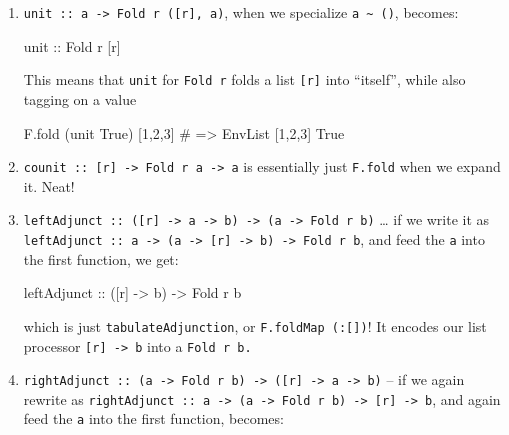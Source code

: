 \documentclass[]{article}
\newenvironment{Shaded}{}{}
\newcommand{\DataTypeTok}[1]{\textcolor[rgb]{0.56,0.13,0.00}{#1}}
\newcommand{\DecValTok}[1]{\textcolor[rgb]{0.25,0.63,0.44}{#1}}
\newcommand{\NormalTok}[1]{#1}
\newcommand{\OtherTok}[1]{\textcolor[rgb]{0.00,0.44,0.13}{#1}}
\newcommand{\PreprocessorTok}[1]{\textcolor[rgb]{0.74,0.48,0.00}{#1}}
\begin{document}
\begin{enumerate}
\def\labelenumi{\arabic{enumi}.}
\item
  \texttt{unit\ ::\ a\ -\textgreater{}\ Fold\ r\ ({[}r{]},\ a)}, when we
  specialize \texttt{a\ \textasciitilde{}\ ()}, becomes:

\begin{Shaded}
\begin{Highlighting}[]
\OtherTok{unit ::} \DataTypeTok{Fold}\NormalTok{ r [r]}
\end{Highlighting}
\end{Shaded}

  This means that \texttt{unit} for \texttt{Fold\ r} folds a list
  \texttt{{[}r{]}} into ``itself'', while also tagging on a value

\begin{Shaded}
\begin{Highlighting}[]
\NormalTok{F.fold (unit }\DataTypeTok{True}\NormalTok{) [}\DecValTok{1}\NormalTok{,}\DecValTok{2}\NormalTok{,}\DecValTok{3}\NormalTok{]}
\PreprocessorTok{\#   => EnvList [1,2,3] True}
\end{Highlighting}
\end{Shaded}
\item
  \texttt{counit\ ::\ {[}r{]}\ -\textgreater{}\ Fold\ r\ a\ -\textgreater{}\ a}
  is essentially just \texttt{F.fold} when we expand it. Neat!
\item
  \texttt{leftAdjunct\ ::\ ({[}r{]}\ -\textgreater{}\ a\ -\textgreater{}\ b)\ -\textgreater{}\ (a\ -\textgreater{}\ Fold\ r\ b)}
  \ldots{} if we write it as
  \texttt{leftAdjunct\ ::\ a\ -\textgreater{}\ (a\ -\textgreater{}\ {[}r{]}\ -\textgreater{}\ b)\ -\textgreater{}\ Fold\ r\ b},
  and feed the \texttt{a} into the first function, we get:

\begin{Shaded}
\begin{Highlighting}[]
\OtherTok{leftAdjunct\textquotesingle{} ::}\NormalTok{ ([r] }\OtherTok{{-}>}\NormalTok{ b) }\OtherTok{{-}>} \DataTypeTok{Fold}\NormalTok{ r b}
\end{Highlighting}
\end{Shaded}

  which is just \texttt{tabulateAdjunction}, or \texttt{F.foldMap\ (:{[}{]})}!
  It encodes our list processor \texttt{{[}r{]}\ -\textgreater{}\ b} into a
  \texttt{Fold\ r\ b.}
\item
  \texttt{rightAdjunct\ ::\ (a\ -\textgreater{}\ Fold\ r\ b)\ -\textgreater{}\ ({[}r{]}\ -\textgreater{}\ a\ -\textgreater{}\ b)}
  -- if we again rewrite as
  \texttt{rightAdjunct\ ::\ a\ -\textgreater{}\ (a\ -\textgreater{}\ Fold\ r\ b)\ -\textgreater{}\ {[}r{]}\ -\textgreater{}\ b},
  and again feed the \texttt{a} into the first function, becomes:


\end{enumerate}
\end{document}

